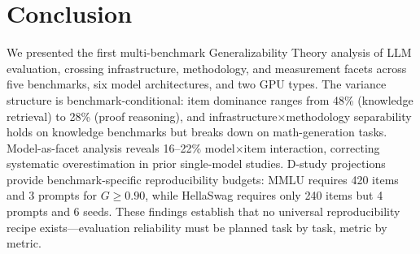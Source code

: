 \documentclass[11pt,twocolumn]{article}
\begin{document}
\section{Conclusion}

We presented the first multi-benchmark Generalizability Theory analysis of LLM evaluation, crossing infrastructure, methodology, and measurement facets across five benchmarks, six model architectures, and two GPU types. The variance structure is benchmark-conditional: item dominance ranges from 48\% (knowledge retrieval) to 28\% (proof reasoning), and infrastructure$\times$methodology separability holds on knowledge benchmarks but breaks down on math-generation tasks. Model-as-facet analysis reveals 16--22\% model$\times$item interaction, correcting systematic overestimation in prior single-model studies. D-study projections provide benchmark-specific reproducibility budgets: MMLU requires 420 items and 3 prompts for $G\geq0.90$, while HellaSwag requires only 240 items but 4 prompts and 6 seeds. These findings establish that no universal reproducibility recipe exists---evaluation reliability must be planned task by task, metric by metric.


\end{document}
